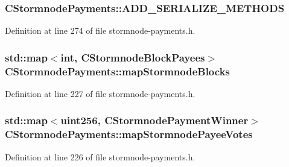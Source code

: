 \subsubsection[{A\+D\+D\+\_\+\+S\+E\+R\+I\+A\+L\+I\+Z\+E\+\_\+\+M\+E\+T\+H\+O\+D\+S}]{\setlength{\rightskip}{0pt plus 5cm}C\+Stormnode\+Payments\+::\+A\+D\+D\+\_\+\+S\+E\+R\+I\+A\+L\+I\+Z\+E\+\_\+\+M\+E\+T\+H\+O\+D\+S}\label{class_c_stormnode_payments_aedb0752fb1e1cb758cfc2fd05d131c40}


Definition at line 274 of file stormnode-\/payments.\+h.

\hypertarget{class_c_stormnode_payments_aad1a7055ea55caa06b4eb291e8b3a348}{}
\subsubsection[{map\+Stormnode\+Blocks}]{\setlength{\rightskip}{0pt plus 5cm}std\+::map$<$int, {\bf C\+Stormnode\+Block\+Payees}$>$ C\+Stormnode\+Payments\+::map\+Stormnode\+Blocks}\label{class_c_stormnode_payments_aad1a7055ea55caa06b4eb291e8b3a348}


Definition at line 227 of file stormnode-\/payments.\+h.

\hypertarget{class_c_stormnode_payments_a2227618f68b1655073c17d4b2ffe1c56}{}
\subsubsection[{map\+Stormnode\+Payee\+Votes}]{\setlength{\rightskip}{0pt plus 5cm}std\+::map$<${\bf uint256}, {\bf C\+Stormnode\+Payment\+Winner}$>$ C\+Stormnode\+Payments\+::map\+Stormnode\+Payee\+Votes}\label{class_c_stormnode_payments_a2227618f68b1655073c17d4b2ffe1c56}


Definition at line 226 of file stormnode-\/payments.\+h.

\hypertarget{class_c_stormnode_payments_a82f9ee8e4388b9640854bd3c70b76782}{}
